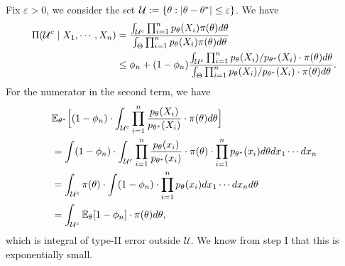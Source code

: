\documentclass[11pt,letterpaper]{article}
\numberwithin{theorem}{lecture}
\numberwithin{proposition}{lecture}
\numberwithin{lemma}{lecture}
\numberwithin{claim}{lecture}
\numberwithin{corollary}{lecture}
\numberwithin{definition}{lecture}
\numberwithin{conjecture}{lecture}
\numberwithin{remark}{lecture}
\numberwithin{example}{lecture}
\numberwithin{equation}{lecture}
\begin{document}
Fix $\varepsilon > 0$, we consider the set $\mathcal{U} := \{\theta: |\theta - {\theta^*}| \leq \varepsilon\}$. We have
\begin{align*}
  \Pi (\mathcal{U}^c \mid X_1, \cdots, X_n) &= \frac{\int_{\mathcal{U}^c} \prod_{i=1}^n p_\theta (X_i) \pi (\theta) d\theta}{\int_{\Theta} \prod_{i=1}^n p_\theta (X_i) \pi (\theta) d\theta}\\
  &\leq \phi_n + (1 - \phi_n) \frac{\int_{\mathcal{U}^c} \prod_{i=1}^n p_\theta (X_i) / p_{{\theta^*}} (X_i) \cdot  \pi (\theta) d\theta}{\int_{\Theta} \prod_{i=1}^n p_\theta (X_i) / p_{{\theta^*}} (X_i) \cdot  \pi (\theta) d\theta}.
\end{align*}
For the numerator in the second term, we have
\begin{align*}
  &{\mathbb{E}}_{{\theta^*}} \Big[ (1 - \phi_n) \cdot \int_{\mathcal{U}^c} \prod_{i=1}^n \frac{p_\theta (X_i)}{p_{{\theta^*}} (X_i)} \cdot \pi (\theta) d\theta \Big]\\
  &=\int  (1 - \phi_n) \cdot \int_{\mathcal{U}^c} \prod_{i=1}^n \frac{p_\theta (x_i)}{p_{{\theta^*}} (x_i)} \cdot \pi (\theta) \cdot \prod_{i=1}^n p_{{\theta^*}} (x_i) d\theta dx_1 \cdots dx_n\\
  &= \int_{\mathcal{U}^c} \pi (\theta) \cdot \int (1 - \phi_n) \cdot \prod_{i=1}^n p_\theta (x_i) dx_1 \cdots dx_n d\theta\\
  &= \int_{\mathcal{U}^c} {\mathbb{E}}_{\theta} [1 - \phi_n] \cdot \pi (\theta) d\theta,
\end{align*}
which is integral of type-II error outside $\mathcal{U}$. We know from step I that this is exponentially small.
\end{document}
